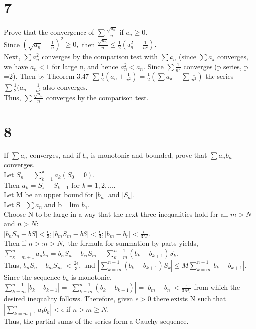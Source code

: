\section*{7}
Prove that the convergence of $\sum \frac{\sqrt{a_n}}{n}$ if $a_n \geq 0.$\\ 
Since $(\sqrt{a_n}-\frac{1}{n})^2 \geq 0,$ then  
$\frac{\sqrt{a_n}}{n}\leq \frac{1}{2}(a_n^2+\frac{1}{n^2}).$\\ 
Next, $\sum a_n^2$ converges by the comparison test with $\sum a_n$ (since $\sum a_n$ converges, we have $a_n <1$ for large n, and hence $a_n^2<a_n.$
Since $\sum \frac{1}{n^2}$ converges (p series, p =2). 
Then by Theorem 3.47 $\sum \frac{1}{2}(a_n+\frac{1}{n^2})=\frac{1}{2}(\sum a_n +\sum \frac{1}{n^2})$ the series $\sum \frac{1}{2}(a_n+\frac{1}{n^2}$ also converges.
\\Thus, $\sum \frac{\sqrt{a_n}}{n}$ converges by the comparison test. \\ 

\section*{8}
If $\sum a_n$ converges, and if ${b_n}$ is monotonic and bounded, prove that $\sum a_n b_n$ converges. \\ 
Let $S_n =\sum_{k=1}^n a_k (S_0 =0).$ 
\\ 
Then $a_k = S_k- S_{k-1}$ for $k=1,2,....$ 
\\
Let M be an upper bound for $|b_n|$ and $|S_n|$. \\ 
Let S=$\sum a_n$ and b= lim $b_n.$ 
\\Choose N to be large in a way that the next three inequalities hold for all $m> N$ and $n> N$:\\ 
$|b_n S_n -bS|<\frac{\epsilon}{3}; |b_mS_m-bS|<\frac{\epsilon}{3}; |b_m-b_n|<\frac{\epsilon}{3M}.$\\ 
Then if $n>m>N,$ the formula for summation by parts yields, $\sum_{k=m+1}^n a_n b_n= b_nS_n-b_mS_m+\sum_{k=m}^{n-1}(b_k-b_{k+1})S_k.$\\ 
Thus, $b_nS_n-b_mS_m|<\frac{2 \epsilon}{3},$ and 
$|\sum_{k=m}^{n-1}(b_k-b_{k+1})S_k|\leq M \sum_{k=m}^{n-1}|b_k-b_{k+1}|.$ \\ 
Since the sequence ${b_n}$ is monotonic,  $\sum_{k=m}^{n-1}|b_k-b_{k+1}|=|\sum_{k=m}^{n-1}(b_k-b_{k+1})|=|b_m-b_n|<\frac{\epsilon}{3M,}$ 
from which the desired inequality follows. 
Therefore, given $\epsilon >0$ there exists N such that $| \sum_{k=m+1}^n a_kb_k|<\epsilon$ if $n> m \geq N.$ 
\\
Thus, the partial sums of the series form a Cauchy sequence.
